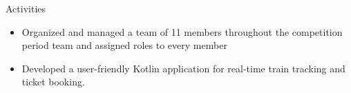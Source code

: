 \documentclass{resume}
\begin{document}
\begin{experienceSection}{Activities}
    \projectItem[
        title={ISF Innovation Catalyst Competition},
        keyHighlight={Porject manager and developer for Egyptian train system solution.},
        duration={Jun 2022 – Mar 2023}
    ]
    \begin{itemize}
        \vspace{-0.5em}
        \itemsep -6pt {}
        \item Organized and managed a team of 11 members throughout the competition period team and assigned roles to every member
        \item Developed a user-friendly Kotlin application for real-time train tracking and ticket booking.
    \end{itemize}
\end{experienceSection}
\end{document}
